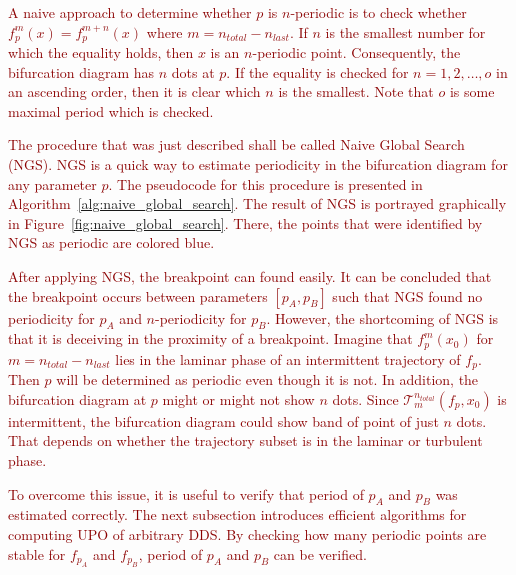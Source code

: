 \par
\textcolor{darkred}{
A naive approach to determine whether $p$ is $n$-periodic is to check whether $f^{m}_{p}(x) = f^{m+n}_{p}(x)$ where $m = n_{total}-n_{last}$.
If $n$ is the smallest number for which the equality holds, then $x$ is an $n$-periodic point.
Consequently, the bifurcation diagram has $n$ dots at $p$.
If the equality is checked for $n = 1,2,\dots,o$ in an ascending order, then it is clear which $n$ is the smallest.
Note that $o$ is some maximal period which is checked.
}
\par
\textcolor{darkred}{
The procedure that was just described shall be called Naive Global Search (NGS).
NGS is a quick way to estimate periodicity in the bifurcation diagram for any parameter $p$.
The pseudocode for this procedure is presented in Algorithm~\ref{alg:naive_global_search}.
The result of NGS is portrayed graphically in Figure~\ref{fig:naive_global_search}.
There, the points that were identified by NGS as periodic are colored blue.
}
\par
\textcolor{darkred}{
After applying NGS, the breakpoint can found easily.
It can be concluded that the breakpoint occurs between parameters $[p_{A}, p_{B}]$ such that NGS found no periodicity for $p_{A}$ and $n$-periodicity for $p_{B}$.
However, the shortcoming of NGS is that it is deceiving in the proximity of a breakpoint.
Imagine that $f^{m}_{p}(x_0)$ for $m = n_{total}-n_{last}$ lies in the laminar phase of an intermittent trajectory of $f_{p}$.
Then $p$ will be determined as periodic even though it is not.
In addition, the bifurcation diagram at $p$ might or might not show $n$ dots.
Since $\mathcal{T}_{m}^{n_{total}}(f_{p}, x_{0})$ is intermittent, the bifurcation diagram could show band of point of just $n$ dots.
That depends on whether the trajectory subset is in the laminar or turbulent phase.
}
\par
\textcolor{darkred}{
To overcome this issue, it is useful to verify that period of $p_{A}$ and $p_{B}$ was estimated correctly.
The next subsection introduces efficient algorithms for computing UPO of arbitrary DDS.
By checking how many periodic points are stable for $f_{p_{A}}$ and $f_{p_{B}}$, period of $p_{A}$ and $p_{B}$ can be verified.
}

